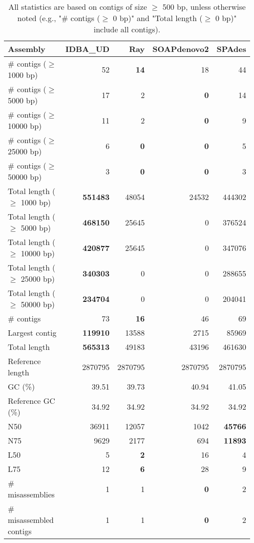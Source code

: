 \documentclass[12pt,a4paper]{article}
\begin{document}
\begin{table}[ht]
\begin{center}
\caption{All statistics are based on contigs of size $\geq$ 500 bp, unless otherwise noted (e.g., "\# contigs ($\geq$ 0 bp)" and "Total length ($\geq$ 0 bp)" include all contigs).}
\begin{tabular}{|l*{4}{|r}|}
\hline
Assembly & IDBA\_UD & Ray & SOAPdenovo2 & SPAdes \\ \hline
\# contigs ($\geq$ 1000 bp) & 52 & {\bf 14} & 18 & 44 \\ \hline
\# contigs ($\geq$ 5000 bp) & 17 & 2 & {\bf 0} & 14 \\ \hline
\# contigs ($\geq$ 10000 bp) & 11 & 2 & {\bf 0} & 9 \\ \hline
\# contigs ($\geq$ 25000 bp) & 6 & {\bf 0} & {\bf 0} & 5 \\ \hline
\# contigs ($\geq$ 50000 bp) & 3 & {\bf 0} & {\bf 0} & 3 \\ \hline
Total length ($\geq$ 1000 bp) & {\bf 551483} & 48054 & 24532 & 444302 \\ \hline
Total length ($\geq$ 5000 bp) & {\bf 468150} & 25645 & 0 & 376524 \\ \hline
Total length ($\geq$ 10000 bp) & {\bf 420877} & 25645 & 0 & 347076 \\ \hline
Total length ($\geq$ 25000 bp) & {\bf 340303} & 0 & 0 & 288655 \\ \hline
Total length ($\geq$ 50000 bp) & {\bf 234704} & 0 & 0 & 204041 \\ \hline
\# contigs & 73 & {\bf 16} & 46 & 69 \\ \hline
Largest contig & {\bf 119910} & 13588 & 2715 & 85969 \\ \hline
Total length & {\bf 565313} & 49183 & 43196 & 461630 \\ \hline
Reference length & 2870795 & 2870795 & 2870795 & 2870795 \\ \hline
GC (\%) & 39.51 & 39.73 & 40.94 & 41.05 \\ \hline
Reference GC (\%) & 34.92 & 34.92 & 34.92 & 34.92 \\ \hline
N50 & 36911 & 12057 & 1042 & {\bf 45766} \\ \hline
N75 & 9629 & 2177 & 694 & {\bf 11893} \\ \hline
L50 & 5 & {\bf 2} & 16 & 4 \\ \hline
L75 & 12 & {\bf 6} & 28 & 9 \\ \hline
\# misassemblies & 1 & 1 & {\bf 0} & 2 \\ \hline
\# misassembled contigs & 1 & 1 & {\bf 0} & 2 \\ \hline

\end{tabular}
\end{center}
\end{table}
\end{document}

